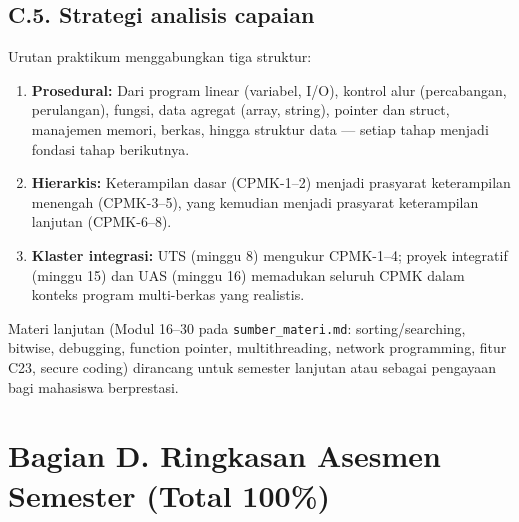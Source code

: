 \documentclass[12pt,a4paper]{article}
\begin{document}
\subsection*{C.5. Strategi analisis capaian}

Urutan praktikum menggabungkan tiga struktur:

\begin{enumerate}[leftmargin=*]
  \item \textbf{Prosedural:} Dari program linear (variabel, I/O), kontrol alur (percabangan, perulangan), fungsi, data agregat (array, string), pointer dan struct, manajemen memori, berkas, hingga struktur data --- setiap tahap menjadi fondasi tahap berikutnya.
  \item \textbf{Hierarkis:} Keterampilan dasar (CPMK-1--2) menjadi prasyarat keterampilan menengah (CPMK-3--5), yang kemudian menjadi prasyarat keterampilan lanjutan (CPMK-6--8).
  \item \textbf{Klaster integrasi:} UTS (minggu 8) mengukur CPMK-1--4; proyek integratif (minggu 15) dan UAS (minggu 16) memadukan seluruh CPMK dalam konteks program multi-berkas yang realistis.
\end{enumerate}

\noindent Materi lanjutan (Modul 16--30 pada \texttt{sumber\_materi.md}: sorting/searching, bitwise, debugging, function pointer, multithreading, network programming, fitur C23, secure coding) dirancang untuk semester lanjutan atau sebagai pengayaan bagi mahasiswa berprestasi.

\vspace{0.75cm}

\section*{Bagian D. Ringkasan Asesmen Semester (Total 100\%)}
\end{document}
